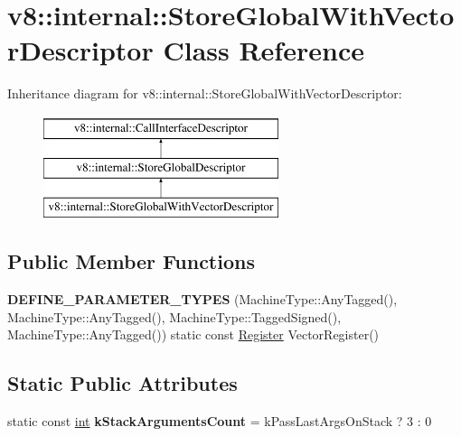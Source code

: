 \hypertarget{classv8_1_1internal_1_1StoreGlobalWithVectorDescriptor}{}\section{v8\+:\+:internal\+:\+:Store\+Global\+With\+Vector\+Descriptor Class Reference}
\label{classv8_1_1internal_1_1StoreGlobalWithVectorDescriptor}
Inheritance diagram for v8\+:\+:internal\+:\+:Store\+Global\+With\+Vector\+Descriptor\+:\begin{figure}[H]
\begin{center}
\leavevmode
\includegraphics[height=3.000000cm]{classv8_1_1internal_1_1StoreGlobalWithVectorDescriptor}
\end{center}
\end{figure}
\subsection*{Public Member Functions}
\begin{DoxyCompactItemize}
\item 
\mbox{\label{classv8_1_1internal_1_1StoreGlobalWithVectorDescriptor_ae236c00eca754d93f363dcc9cb34a767}} 
{\bfseries D\+E\+F\+I\+N\+E\+\_\+\+P\+A\+R\+A\+M\+E\+T\+E\+R\+\_\+\+T\+Y\+P\+ES} (Machine\+Type\+::\+Any\+Tagged(), Machine\+Type\+::\+Any\+Tagged(), Machine\+Type\+::\+Tagged\+Signed(), Machine\+Type\+::\+Any\+Tagged()) static const \mbox{\hyperlink{classv8_1_1internal_1_1Register}{Register}} Vector\+Register()
\end{DoxyCompactItemize}
\subsection*{Static Public Attributes}
\begin{DoxyCompactItemize}
\item 
\mbox{\label{classv8_1_1internal_1_1StoreGlobalWithVectorDescriptor_a6c08ca3c13d1bd3eda47d6b6731b8bc7}} 
static const \mbox{\hyperlink{classint}{int}} {\bfseries k\+Stack\+Arguments\+Count} = k\+Pass\+Last\+Args\+On\+Stack ? 3 \+: 0
\end{DoxyCompactItemize}
